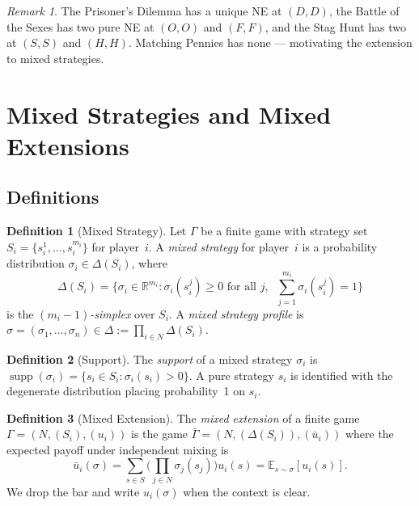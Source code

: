 \documentclass[11pt,a4paper]{article}
\theoremstyle{definition}
\newtheorem{definition}{Definition}[section]
\theoremstyle{plain}
\theoremstyle{remark}
\newtheorem{remark}{Remark}[section]
\newcommand{\R}{\mathbb{R}}
\newcommand{\E}{\mathbb{E}}
\DeclareMathOperator{\supp}{supp}
\begin{document}
\begin{remark}
The Prisoner's Dilemma has a unique NE at $(D,D)$, the Battle of the Sexes has two
pure NE at $(O,O)$ and $(F,F)$, and the Stag Hunt has two at $(S,S)$ and $(H,H)$.
Matching Pennies has none --- motivating the extension to mixed strategies.
\end{remark}

\section{Mixed Strategies and Mixed Extensions}
\label{sec:mixed}

\subsection{Definitions}
\label{subsec:mixed_def}

\begin{definition}[Mixed Strategy]
\label{def:mixed_strategy}
Let $\Gamma$ be a finite game with strategy set $S_i = \{s_i^1, \ldots, s_i^{m_i}\}$
for player~$i$. A \emph{mixed strategy} for player~$i$ is a probability distribution
$\sigma_i \in \Delta(S_i)$, where
\[
    \Delta(S_i) = \bigg\{\sigma_i \in \R^{m_i} : \sigma_i(s_i^j) \geq 0
    \text{ for all } j, \;\; \sum_{j=1}^{m_i} \sigma_i(s_i^j) = 1\bigg\}
\]
is the \emph{$(m_i-1)$-simplex} over $S_i$. A \emph{mixed strategy profile} is
$\sigma = (\sigma_1, \ldots, \sigma_n) \in \Delta := \prod_{i \in N} \Delta(S_i)$.
\end{definition}

\begin{definition}[Support]
\label{def:support}
The \emph{support} of a mixed strategy $\sigma_i$ is
$\supp(\sigma_i) = \{s_i \in S_i : \sigma_i(s_i) > 0\}$.
A pure strategy $s_i$ is identified with the degenerate distribution placing
probability~1 on $s_i$.
\end{definition}

\begin{definition}[Mixed Extension]
\label{def:mixed_extension}
The \emph{mixed extension} of a finite game $\Gamma = (N, (S_i), (u_i))$ is the game
$\bar{\Gamma} = (N, (\Delta(S_i)), (\bar{u}_i))$ where the expected payoff under
independent mixing is
\[
    \bar{u}_i(\sigma) = \sum_{s \in S} \bigg(\prod_{j \in N} \sigma_j(s_j)\bigg) u_i(s)
    = \E_{s \sim \sigma}[u_i(s)].
\]
We drop the bar and write $u_i(\sigma)$ when the context is clear.
\end{definition}
\end{document}
